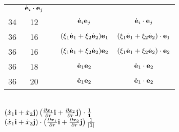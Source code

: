 \documentclass[a4paper,11pt]{article}
\begin{document}
\begin{center}
\begin{tabular}{|c|c|c|c|c|}
           & $\dot{ \mathbf{e} }_{ i } \cdot \mathbf{e}_{ j }$ \\
    34  & 12 & & $\dot{ \mathbf{e} }_{ i } \mathbf{e}_{ j }$
           & $\dot{ \mathbf{e} }_{ i } \cdot \mathbf{e}_{ j }$ \\
    36  & 16 & & $( \xi_{ 1 } \dot{ \mathbf{e} }_{ 1 }
                 + \xi_{ 2 } \dot{ \mathbf{e} }_{ 2 }  ) \mathbf{e}_{ 1 }$
           & $( \xi_{ 1 } \dot{ \mathbf{e} }_{ 1 }
             + \xi_{ 2 } \dot{ \mathbf{e} }_{ 2 }  ) \cdot \mathbf{e}_{ 1 }$ \\
    36  & 16 & & $( \xi_{ 1 } \dot{ \mathbf{e} }_{ 1 }
                 + \xi_{ 2 } \dot{ \mathbf{e} }_{ 2 }  ) \mathbf{e}_{ 2 }$
           & $( \xi_{ 1 } \dot{ \mathbf{e} }_{ 1 }
             + \xi_{ 2 } \dot{ \mathbf{e} }_{ 2 }  ) \cdot \mathbf{e}_{ 2 }$ \\
    36  & 18 & & $\dot{ \mathbf{e} }_{ 1 } \mathbf{e}_{ 2 }$
           & $\dot{ \mathbf{e} }_{ 1 } \cdot \mathbf{e}_{ 2 }$ \\
    36  & 20 & & $\dot{ \mathbf{e} }_{ 1 } \mathbf{e}_{ 2 }$
           & $\dot{ \mathbf{e} }_{ 1 } \cdot \mathbf{e}_{ 2 }$ \\
    \hline
  \end{tabular}

\end{center}


\noindent
{} \\[0.3em]
\Jest
$( \dot{ x }_{ 1 } \mathbf{i} + \dot{ x }_{ 2 } \mathbf{j} )
\left( \frac{ \partial x_{ 1 } }{ \partial r } \mathbf{i}
  + \frac{ \partial x_{ 2 } }{ \partial r } \mathbf{j} \right)
\cdot \frac{ 1 }{ \mathbf{1} }$ \\[0.5em]
\Powin
$( \dot{ x }_{ 1 } \mathbf{i} + \dot{ x }_{ 2 } \mathbf{j} )
\cdot \left( \frac{ \partial x_{ 1 } }{ \partial r } \mathbf{i}
  + \frac{ \partial x_{ 2 } }{ \partial r } \mathbf{j} \right)
\frac{ 1 }{ | \mathbf{1} | }$ \\


\vspace{\spaceTwo}










\end{document}

